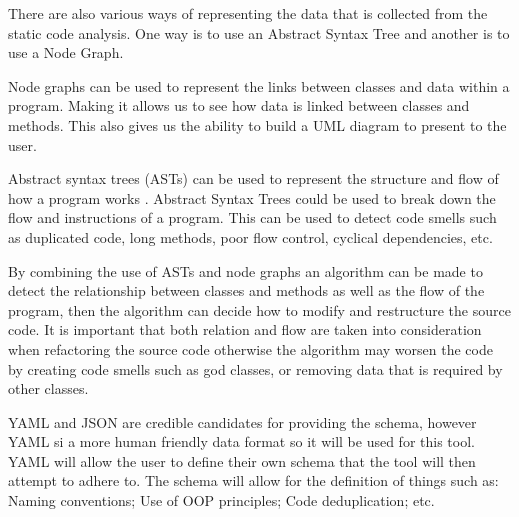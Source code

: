 There are also various ways of representing the data that is collected from the static code analysis. One way is to use an Abstract Syntax Tree \citep{8802820} and another is to use a Node Graph.

Node graphs can be used to represent the links between classes and data within a program. Making it allows us to see how data is linked between classes and methods. This also gives us the ability to build a UML diagram to present to the user.

Abstract syntax trees (ASTs) can be used to represent the structure and flow of how a program works \citep{8802820}. Abstract Syntax Trees could be used to break down the flow and instructions of a program. This can be used to detect code smells such as duplicated code, long methods, poor flow control, cyclical dependencies, etc.

By combining the use of ASTs and node graphs an algorithm can be made to detect the relationship between classes and methods as well as the flow of the program, then the algorithm can decide how to modify and restructure the source code. It is important that both relation and flow are taken into consideration when refactoring the source code otherwise the algorithm may worsen the code by creating code smells such as god classes, or removing data that is required by other classes.

YAML and JSON are credible candidates for providing the schema, however YAML si a more human friendly data format so it will be used for this tool. YAML will allow the user to define their own schema that the tool will then attempt to adhere to. The schema will allow for the definition of things such as: Naming conventions; Use of OOP principles; Code deduplication; etc.
